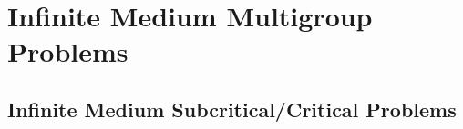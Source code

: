 %

\clearpage
\section{Infinite Medium Multigroup Problems}

\subsection{Infinite Medium Subcritical/Critical Problems}

